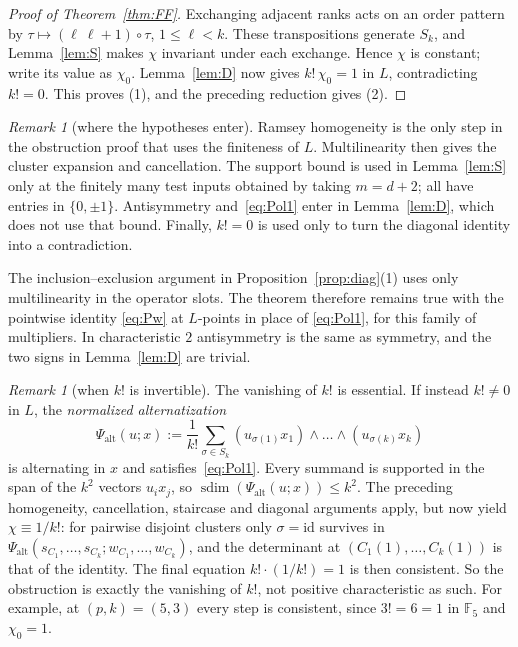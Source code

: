 \documentclass[11pt]{amsart}
\theoremstyle{definition}
\theoremstyle{remark}
\newtheorem{remark}[theorem]{Remark}
\numberwithin{equation}{section}
\newcommand{\F}{\mathbb F}
\newcommand{\id}{\mathrm{id}}
\newcommand{\sdim}{\operatorname{sdim}}
\begin{document}
\begin{proof}[Proof of Theorem~\ref{thm:FF}]
Exchanging adjacent ranks acts on an order pattern by
$\tau\mapsto(\ell\ \ell{+}1)\circ\tau$, $1\le\ell<k$. These transpositions generate $S_k$, and Lemma~\ref{lem:S}
makes $\chi$ invariant under each exchange. Hence $\chi$ is constant; write its value as $\chi_0$.
Lemma~\ref{lem:D} now gives $k!\,\chi_0=1$ in $L$, contradicting $k!=0$. This proves (1), and the preceding reduction
gives (2).
\end{proof}

\begin{remark}[where the hypotheses enter]\label{rem:FFhyp}
Ramsey homogeneity is the only step in the obstruction proof that uses the finiteness of $L$.
Multilinearity then gives the cluster expansion and cancellation. The support bound is used in Lemma~\ref{lem:S}
only at the finitely many test inputs obtained by taking $m=d+2$; all have entries in $\{0,\pm1\}$.
Antisymmetry and~\eqref{eq:Pol1} enter in Lemma~\ref{lem:D}, which does not use that bound. Finally, $k!=0$ is used only
to turn the diagonal identity into a contradiction.

The inclusion--exclusion argument in Proposition~\ref{prop:diag}(1) uses only multilinearity in the
operator slots. The theorem therefore remains true with the pointwise identity \eqref{eq:Pw} at $L$\nobreakdash-points in place of
\eqref{eq:Pol1}, for this family of multipliers. In characteristic $2$ antisymmetry is the same as symmetry, and the two signs in
Lemma~\ref{lem:D} are trivial.
\end{remark}

\begin{remark}[when $k!$ is invertible]\label{rem:FFunit}
The vanishing of $k!$ is essential. If instead $k!\ne0$ in $L$, the \emph{normalized alternatization}
\[
\Psi_{\mathrm{alt}}(u;x):=\frac1{k!}\sum_{\sigma\in S_k}(u_{\sigma(1)}x_1)\wedge\dots\wedge(u_{\sigma(k)}x_k)
\]
is alternating in $x$ and satisfies~\eqref{eq:Pol1}. Every summand is supported in the span of the $k^2$ vectors
$u_ix_j$, so $\sdim(\Psi_{\mathrm{alt}}(u;x))\le k^2$. The preceding homogeneity, cancellation, staircase and diagonal
arguments apply, but now yield $\chi\equiv1/k!$: for pairwise disjoint clusters only $\sigma=\id$
survives in $\Psi_{\mathrm{alt}}(s_{C_1},\dots,s_{C_k};w_{C_1},\dots,w_{C_k})$, and the determinant at
$(C_1(1),\dots,C_k(1))$ is that of the identity. The final equation $k!\cdot(1/k!)=1$ is then consistent. So the
obstruction is exactly the vanishing of $k!$, not positive characteristic as such. For example, at $(p,k)=(5,3)$ every
step is consistent, since $3!=6=1$ in $\F_5$ and $\chi_0=1$.
\end{remark}
\end{document}

